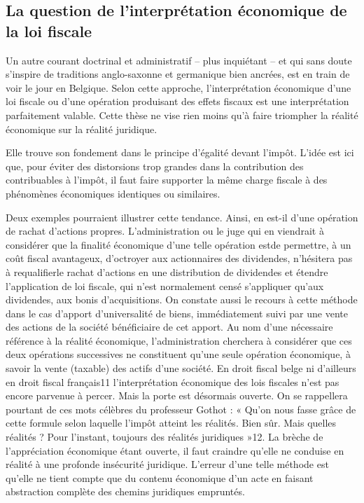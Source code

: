 \documentclass{book}
\begin{document}
\subsection*{La question de l’interprétation économique de la loi ﬁscale}

Un autre courant doctrinal et administratif – plus inquiétant – et qui sans doute s’inspire de traditions anglo-saxonne et germanique bien ancrées, est en train de voir le jour en Belgique. Selon cette approche, l’interprétation économique d’une loi ﬁscale ou d’une opération produisant des effets ﬁscaux est une interprétation parfaitement valable. Cette thèse ne vise rien moins qu’à faire triompher la réalité économique sur la réalité juridique.

Elle trouve son fondement dans le principe d’égalité devant l’impôt. L’idée est ici que, pour éviter des distorsions trop grandes dans la contribution des contribuables à l’impôt, il faut faire supporter la même charge ﬁscale à des phénomènes économiques identiques ou similaires.

Deux exemples pourraient illustrer cette tendance. Ainsi, en est-il d’une opération de rachat d’actions propres.
L’administration ou le juge qui en viendrait à considérer que la ﬁnalité économique d’une telle opération estde permettre, à un coût ﬁscal avantageux, d’octroyer aux actionnaires des dividendes, n’hésitera pas à requaliﬁerle rachat d’actions en une distribution de dividendes et étendre l’application de loi ﬁscale, qui n’est normalement censé s’appliquer qu’aux dividendes, aux bonis d’acquisitions. On constate aussi le recours à cette méthode dans le cas d’apport d’universalité de biens, immédiatement suivi par une vente des actions de la société bénéﬁciaire de cet apport. Au nom d’une nécessaire référence à la réalité économique, l’administration cherchera à considérer que ces deux opérations successives ne constituent qu’une seule opération économique, à savoir la vente (taxable) des actifs d’une société. En droit ﬁscal belge ni d’ailleurs en droit ﬁscal français11 l’interprétation économique des lois ﬁscales n’est pas encore parvenue à percer. Mais la porte est désormais ouverte. On se rappellera pourtant de ces mots célèbres du professeur Gothot : « Qu’on nous fasse grâce de cette formule selon laquelle l’impôt atteint les réalités. Bien sûr. Mais quelles réalités ? Pour l’instant, toujours des réalités juridiques »12. La brèche de l’appréciation économique étant ouverte, il faut craindre qu’elle ne conduise en réalité à une profonde insécurité juridique. L’erreur d’une telle méthode est qu’elle ne tient compte que du contenu économique d’un acte en faisant abstraction complète des chemins juridiques empruntés.
\end{document}
